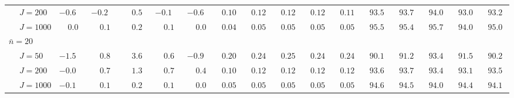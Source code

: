 \begin{sidewaystable}
\begin{threeparttable}
\begin{tabular}{llccccccccccccccc}
 & \nopagebreak $\;J=200$  & ${-}0.6\phantom{0}$ & ${-}0.2\phantom{0}$ & $\phantom{-}0.5\phantom{0}$ & ${-}0.1\phantom{0}$ & ${-}0.6\phantom{0}$ & $\phantom{0}0.10\phantom{0}$ & $\phantom{0}0.12\phantom{0}$ & $\phantom{0}0.12\phantom{0}$ & $\phantom{0}0.12\phantom{0}$ & $\phantom{0}0.11\phantom{0}$ & $\phantom{0}93.5\phantom{0}$ & $\phantom{0}93.7\phantom{0}$ & $\phantom{0}94.0\phantom{0}$ & $\phantom{0}93.0\phantom{0}$ & $\phantom{0}93.2\phantom{0}$ \\
 & \nopagebreak $\;J=1000$  & $\phantom{-}0.0\phantom{0}$ & $\phantom{-}0.1\phantom{0}$ & $\phantom{-}0.2\phantom{0}$ & $\phantom{-}0.1\phantom{0}$ & $\phantom{-}0.0\phantom{0}$ & $\phantom{0}0.04\phantom{0}$ & $\phantom{0}0.05\phantom{0}$ & $\phantom{0}0.05\phantom{0}$ & $\phantom{0}0.05\phantom{0}$ & $\phantom{0}0.05\phantom{0}$ & $\phantom{0}95.5\phantom{0}$ & $\phantom{0}95.4\phantom{0}$ & $\phantom{0}95.7\phantom{0}$ & $\phantom{0}94.0\phantom{0}$ & $\phantom{0}95.0\phantom{0}$ \\
\multicolumn{4}{l}{$\bar{n}=20$} \\  & \nopagebreak $\;J=50$  & ${-}1.5\phantom{0}$ & $\phantom{-}0.8\phantom{0}$ & $\phantom{-}3.6\phantom{0}$ & $\phantom{-}0.6\phantom{0}$ & ${-}0.9\phantom{0}$ & $\phantom{0}0.20\phantom{0}$ & $\phantom{0}0.24\phantom{0}$ & $\phantom{0}0.25\phantom{0}$ & $\phantom{0}0.24\phantom{0}$ & $\phantom{0}0.24\phantom{0}$ & $\phantom{0}90.1\phantom{0}$ & $\phantom{0}91.2\phantom{0}$ & $\phantom{0}93.4\phantom{0}$ & $\phantom{0}91.5\phantom{0}$ & $\phantom{0}90.2\phantom{0}$ \\
 & \nopagebreak $\;J=200$  & ${-}0.0\phantom{0}$ & $\phantom{-}0.7\phantom{0}$ & $\phantom{-}1.3\phantom{0}$ & $\phantom{-}0.7\phantom{0}$ & $\phantom{-}0.4\phantom{0}$ & $\phantom{0}0.10\phantom{0}$ & $\phantom{0}0.12\phantom{0}$ & $\phantom{0}0.12\phantom{0}$ & $\phantom{0}0.12\phantom{0}$ & $\phantom{0}0.12\phantom{0}$ & $\phantom{0}93.6\phantom{0}$ & $\phantom{0}93.7\phantom{0}$ & $\phantom{0}93.4\phantom{0}$ & $\phantom{0}93.1\phantom{0}$ & $\phantom{0}93.5\phantom{0}$ \\
 & \nopagebreak $\;J=1000$  & ${-}0.1\phantom{0}$ & $\phantom{-}0.1\phantom{0}$ & $\phantom{-}0.2\phantom{0}$ & $\phantom{-}0.1\phantom{0}$ & $\phantom{-}0.0\phantom{0}$ & $\phantom{0}0.05\phantom{0}$ & $\phantom{0}0.05\phantom{0}$ & $\phantom{0}0.05\phantom{0}$ & $\phantom{0}0.05\phantom{0}$ & $\phantom{0}0.05\phantom{0}$ & $\phantom{0}94.6\phantom{0}$ & $\phantom{0}94.5\phantom{0}$ & $\phantom{0}94.0\phantom{0}$ & $\phantom{0}94.4\phantom{0}$ & $\phantom{0}94.1\phantom{0}$ \\

\end{tabular}
\end{threeparttable}
\end{sidewaystable}
